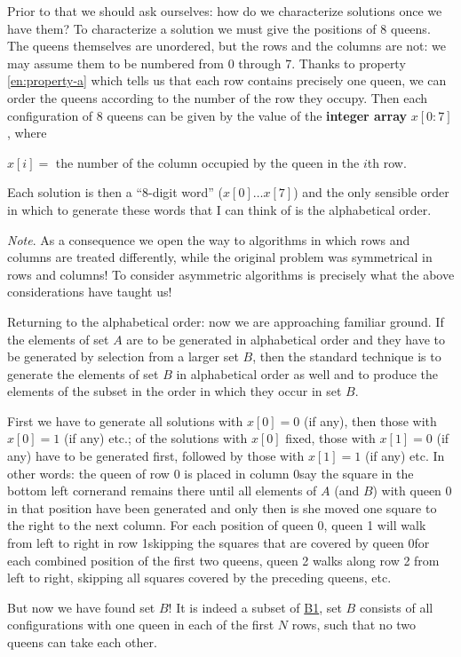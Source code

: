 Prior to that we should ask ourselves: how do we characterize solutions once we have them? To characterize a solution we must give the positions of 8 queens. The queens themselves are unordered, but the rows and the columns are not: we may assume them to be numbered from 0 through 7. Thanks to property \ref{en:property-a} which tells us that each row contains precisely one queen, we can order the queens according to the number of the row they occupy. Then each configuration of 8 queens can be given by the value of the \textbf{integer array} $x[0:7]$, where

\noindent
$x[i] =$ the number of the column occupied by the queen in the $i$th row.

Each solution is then a ``8-digit word'' ($x[0] \dots x[7]$) and the only sensible order in which to generate these words that I can think of is the alphabetical order.

\noindent
\textit{Note}. As a consequence we open the way to algorithms in which rows and columns are treated differently, while the original problem was symmetrical in rows and columns! To consider asymmetric algorithms is precisely what the above considerations have taught us!

Returning to the alphabetical order: now we are approaching familiar ground. If the elements of set $A$ are to be generated in alphabetical order and they have to be generated by selection from a larger set $B$, then the standard technique is to generate the elements of set $B$ in alphabetical order as well and to produce the elements of the subset in the order in which they occur in set $B$.

First we have to generate all solutions with $x[0] = 0$ (if any), then those with $x[0] = 1$ (if any) etc.; of the solutions with $x[0]$ fixed, those with $x[1] = 0$ (if any) have to be generated first, followed by those with $x[1] = 1$ (if any) etc. In other words: the queen of row 0 is placed in column 0\textemdash{}say the square in the bottom left corner\textemdash{}and remains there until all elements of $A$ (and $B$) with queen 0 in that position have been generated and only then is she moved one square to the right to the next column. For each position of queen 0, queen 1 will walk from left to right in row 1\textemdash{}skipping the squares that are covered by queen 0\textemdash{}for each combined position of the first two queens, queen 2 walks along row 2 from left to right, skipping all squares covered by the preceding queens, etc.

But now we have found set $B$! It is indeed a subset of \hyperref[en:b1-eight-queens]{B1}, set $B$ consists of all configurations with one queen in each of the first $N$ rows, such that no two queens can take each other.

